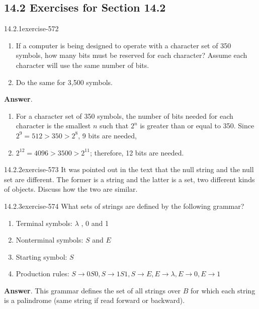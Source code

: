 \documentclass[twoside,10pt,]{book}
\numberwithin{equation}{section}
\begin{document}
\subsection*{14.2 Exercises for Section 14.2}
\begin{divisionsolution}{14.2.1}{}{exercise-572}%
\hypertarget{p-5167}{}%
\leavevmode%
\begin{enumerate}[label=(\alph*)]
\item\hypertarget{li-2350}{}\hypertarget{p-5168}{}%
If a computer is being designed to operate with a character set of 350 symbols, how many bits must be reserved for each character? Assume each character will use the same number of bits.%
\item\hypertarget{li-2351}{}\hypertarget{p-5169}{}%
Do the same for 3,500 symbols.%
\end{enumerate}
%
\par\smallskip%
\noindent\textbf{Answer}.\quad%
\hypertarget{p-5170}{}%
\leavevmode%
\begin{enumerate}[label=(\alph*)]
\item\hypertarget{li-2352}{}\hypertarget{p-5171}{}%
For a character set of 350 symbols, the number of bits needed for each character is the smallest \(n\) such that \(2^n\) is greater than or equal to 350.  Since   \(2^9= 512 > 350 > 2^8\),  9 bits are needed,%
\item\hypertarget{li-2353}{}\hypertarget{p-5172}{}%
\(2^{12}=4096 >3500> 2^{11}\); therefore, 12 bits are needed.%
\end{enumerate}
%
\end{divisionsolution}%
\begin{divisionsolution}{14.2.2}{}{exercise-573}%
\hypertarget{p-5173}{}%
It was pointed out in the text that the null string and the null set are different. The former is a string and the latter is a set, two different kinds of objects. Discuss how the two are similar.%
\end{divisionsolution}%
\begin{divisionsolution}{14.2.3}{}{exercise-574}%
\hypertarget{p-5174}{}%
What sets of strings are defined by the following grammar?\leavevmode%
\begin{enumerate}[label=(\alph*)]
\item\hypertarget{li-2354}{}\hypertarget{p-5175}{}%
Terminal symbols: \(\lambda\) , 0 and 1%
\item\hypertarget{li-2355}{}\hypertarget{p-5176}{}%
Nonterminal symbols: \(S\) and \(E\)%
\item\hypertarget{li-2356}{}\hypertarget{p-5177}{}%
Starting symbol: \(S\)%
\item\hypertarget{li-2357}{}\hypertarget{p-5178}{}%
Production rules: \(S\to 0S0, S \to 1S1, S\to E, E \to \lambda, E\to 0, E\to 1\)%
\end{enumerate}
%
\par\smallskip%
\noindent\textbf{Answer}.\quad%
\hypertarget{p-5179}{}%
This grammar defines the set of all strings over \(B\) for which each string is a palindrome (same string if read forward or backward).%
\end{divisionsolution}%
\end{document}
